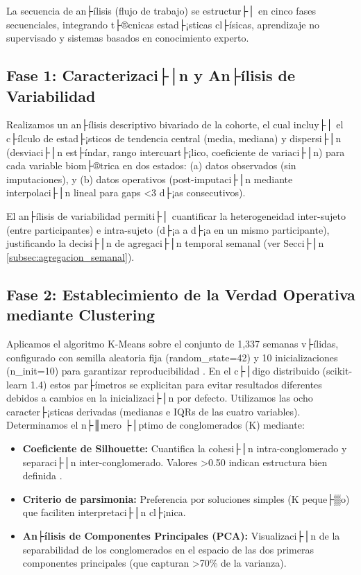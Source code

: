 La secuencia de an├ílisis (flujo de trabajo) se estructur├│ en cinco fases secuenciales, integrando t├®cnicas estad├¡sticas cl├ísicas, aprendizaje no supervisado y sistemas basados en conocimiento experto.

\subsection{Fase 1: Caracterizaci├│n y An├ílisis de Variabilidad}
\label{subsec:fase1_caracterizacion}

Realizamos un an├ílisis descriptivo bivariado de la cohorte, el cual incluy├│ el c├ílculo de estad├¡sticos de tendencia central (media, mediana) y dispersi├│n (desviaci├│n est├índar, rango intercuart├¡lico, coeficiente de variaci├│n) para cada variable biom├®trica en dos estados: (a) datos observados (sin imputaciones), y (b) datos operativos (post-imputaci├│n mediante interpolaci├│n lineal para gaps <3 d├¡as consecutivos).

El an├ílisis de variabilidad permiti├│ cuantificar la heterogeneidad inter-sujeto (entre participantes) e intra-sujeto (d├¡a a d├¡a en un mismo participante), justificando la decisi├│n de agregaci├│n temporal semanal (ver Secci├│n \ref{subsec:agregacion_semanal}).

\subsection{Fase 2: Establecimiento de la Verdad Operativa mediante Clustering}
\label{subsec:fase2_clustering}

Aplicamos el algoritmo K-Means sobre el conjunto de 1,337 semanas v├ílidas, configurado con semilla aleatoria fija (random\_state=42) y 10 inicializaciones (n\_init=10) para garantizar reproducibilidad \citep{Pedregosa2011sklearn}. En el c├│digo distribuido (scikit-learn 1.4) estos par├ímetros se explicitan para evitar resultados diferentes debidos a cambios en la inicializaci├│n por defecto. Utilizamos las ocho caracter├¡sticas derivadas (medianas e IQRs de las cuatro variables). Determinamos el n├║mero ├│ptimo de conglomerados (K) mediante:

\begin{itemize}
    \item \textbf{Coeficiente de Silhouette:} Cuantifica la cohesi├│n intra-conglomerado y separaci├│n inter-conglomerado. Valores >0.50 indican estructura bien definida \cite{Rousseeuw1987}.
    
    \item \textbf{Criterio de parsimonia:} Preferencia por soluciones simples (K peque├▒o) que faciliten interpretaci├│n cl├¡nica.
    
    \item \textbf{An├ílisis de Componentes Principales (PCA):} Visualizaci├│n de la separabilidad de los conglomerados en el espacio de las dos primeras componentes principales (que capturan >70\% de la varianza).
\end{itemize}


